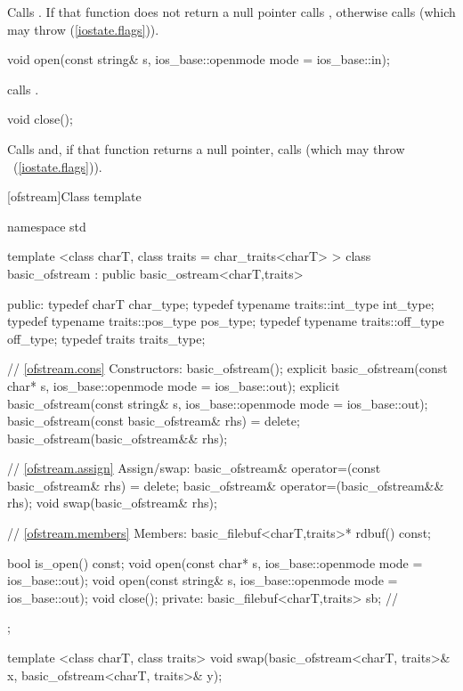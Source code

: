 \begin{itemdescr}
\pnum
\effects
Calls
.
If that function does not return a null pointer
calls ,
otherwise calls
(which may throw
 (\ref{iostate.flags})).
\end{itemdescr}

%
\begin{itemdecl}
void open(const string& s, ios_base::openmode mode = ios_base::in);
\end{itemdecl}

\begin{itemdescr}
\pnum
\effects  calls .
\end{itemdescr}

%
\begin{itemdecl}
void close();
\end{itemdecl}

\begin{itemdescr}
\pnum
\effects
Calls
and, if that function returns
a null pointer,
calls
(which may throw
~(\ref{iostate.flags})).
\end{itemdescr}

[ofstream]{Class template }

%
\begin{codeblock}
namespace std {
  template <class charT, class traits = char_traits<charT> >
  class basic_ofstream : public basic_ostream<charT,traits> {
  public:
    typedef charT                     char_type;
    typedef typename traits::int_type int_type;
    typedef typename traits::pos_type pos_type;
    typedef typename traits::off_type off_type;
    typedef traits                    traits_type;

    // \ref{ofstream.cons} Constructors:
    basic_ofstream();
    explicit basic_ofstream(const char* s,
        ios_base::openmode mode = ios_base::out);
    explicit basic_ofstream(const string& s,
        ios_base::openmode mode = ios_base::out);
    basic_ofstream(const basic_ofstream& rhs) = delete;
    basic_ofstream(basic_ofstream&& rhs);

    // \ref{ofstream.assign} Assign/swap:
    basic_ofstream& operator=(const basic_ofstream& rhs) = delete;
    basic_ofstream& operator=(basic_ofstream&& rhs);
    void swap(basic_ofstream& rhs);

    // \ref{ofstream.members} Members:
    basic_filebuf<charT,traits>* rdbuf() const;

    bool is_open() const;
    void open(const char* s, ios_base::openmode mode = ios_base::out);
    void open(const string& s, ios_base::openmode mode = ios_base::out);
    void close();
  private:
    basic_filebuf<charT,traits> sb; // \exposr
  };

  template <class charT, class traits>
  void swap(basic_ofstream<charT, traits>& x,
            basic_ofstream<charT, traits>& y);
}
\end{codeblock}

